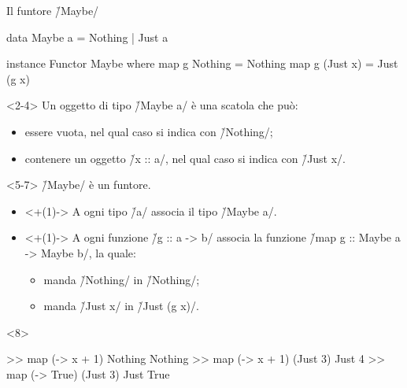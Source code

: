\begin{frame}[fragile]{\secname}{Il funtore \h/Maybe/}
\begin{overlayarea}{\textwidth}{0.7\textheight}
\begin{haskellcode}
data Maybe a = Nothing | Just a

instance Functor Maybe where
    map g Nothing = Nothing
    map g (Just x) = Just (g x)
\end{haskellcode}

\begin{onlyenv}<2-4>
Un oggetto di tipo \h/Maybe a/ è una scatola che può:
\pause
\begin{itemize}[<+(1)->]
\item essere vuota, nel qual caso si indica con \h/Nothing/;
\item contenere un oggetto \h/x :: a/, nel qual caso si indica con \h/Just x/.
\end{itemize}
\end{onlyenv}

\begin{onlyenv}<5-7>
\h/Maybe/ è un funtore.
\pause
\begin{itemize}
\item<+(1)-> A ogni tipo \h/a/ associa il tipo \h/Maybe a/.
\item<+(1)-> A ogni funzione \h/g :: a -> b/ associa la funzione \h/map g :: Maybe a -> Maybe b/, la quale:
\begin{itemize}
\item manda \h/Nothing/ in \h/Nothing/;
\item manda \h/Just x/ in \h/Just (g x)/.
\end{itemize}
\end{itemize}
\end{onlyenv}

\begin{onlyenv}<8>
\begin{runhaskell}
>>  map (\x -> x + 1) Nothing
    Nothing
>>  map (\x -> x + 1) (Just 3)
    Just 4
>>  map (\x -> True) (Just 3)
    Just True
\end{runhaskell}
\end{onlyenv}
\end{overlayarea}
\end{frame}

